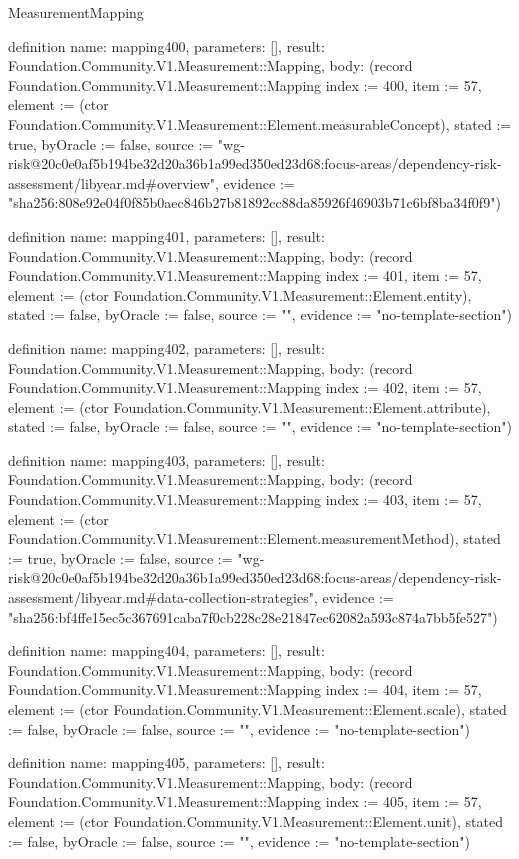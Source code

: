 \begin{lexlean}{MeasurementMapping}
\begin{semanticmodule}
definition{
  name: mapping400,
  parameters: [],
  result: Foundation.Community.V1.Measurement::Mapping,
  body: (record Foundation.Community.V1.Measurement::Mapping {index := 400, item := 57, element := (ctor Foundation.Community.V1.Measurement::Element.measurableConcept), stated := true, byOracle := false, source := "wg-risk@20c0e0af5b194be32d20a36b1a99ed350ed23d68:focus-areas/dependency-risk-assessment/libyear.md#overview", evidence := "sha256:808e92e04f0f85b0aec846b27b81892cc88da85926f46903b71c6bf8ba34f0f9"})
}

definition{
  name: mapping401,
  parameters: [],
  result: Foundation.Community.V1.Measurement::Mapping,
  body: (record Foundation.Community.V1.Measurement::Mapping {index := 401, item := 57, element := (ctor Foundation.Community.V1.Measurement::Element.entity), stated := false, byOracle := false, source := "", evidence := "no-template-section"})
}

definition{
  name: mapping402,
  parameters: [],
  result: Foundation.Community.V1.Measurement::Mapping,
  body: (record Foundation.Community.V1.Measurement::Mapping {index := 402, item := 57, element := (ctor Foundation.Community.V1.Measurement::Element.attribute), stated := false, byOracle := false, source := "", evidence := "no-template-section"})
}

definition{
  name: mapping403,
  parameters: [],
  result: Foundation.Community.V1.Measurement::Mapping,
  body: (record Foundation.Community.V1.Measurement::Mapping {index := 403, item := 57, element := (ctor Foundation.Community.V1.Measurement::Element.measurementMethod), stated := true, byOracle := false, source := "wg-risk@20c0e0af5b194be32d20a36b1a99ed350ed23d68:focus-areas/dependency-risk-assessment/libyear.md#data-collection-strategies", evidence := "sha256:bf4ffe15ec5c367691caba7f0cb228c28e21847ec62082a593c874a7bb5fe527"})
}

definition{
  name: mapping404,
  parameters: [],
  result: Foundation.Community.V1.Measurement::Mapping,
  body: (record Foundation.Community.V1.Measurement::Mapping {index := 404, item := 57, element := (ctor Foundation.Community.V1.Measurement::Element.scale), stated := false, byOracle := false, source := "", evidence := "no-template-section"})
}

definition{
  name: mapping405,
  parameters: [],
  result: Foundation.Community.V1.Measurement::Mapping,
  body: (record Foundation.Community.V1.Measurement::Mapping {index := 405, item := 57, element := (ctor Foundation.Community.V1.Measurement::Element.unit), stated := false, byOracle := false, source := "", evidence := "no-template-section"})
}


\end{semanticmodule}
\end{lexlean}
